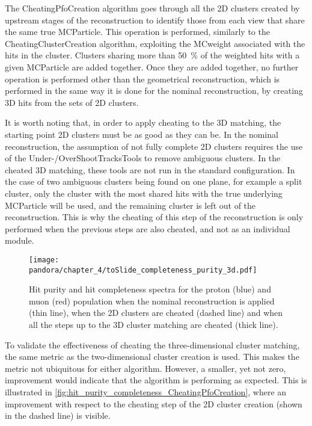 The CheatingPfoCreation algorithm goes through all the 2D clusters created by upstream stages of the reconstruction to identify those from each view that share the same true MCParticle. This operation is performed, similarly to the CheatingClusterCreation algorithm, exploiting the MCweight associated with the hits in the cluster. Clusters sharing more than \SI{50}{\percent} of the weighted hits with a given MCParticle are added together. Once they are added together, no further operation is performed other than the geometrical reconstruction, which is performed in the same way it is done for the nominal reconstruction, by creating 3D hits from the sets of 2D clusters. 

It is worth noting that, in order to apply cheating to the 3D matching, the starting point 2D clusters must be as good as they can be. In the nominal reconstruction, the assumption of not fully complete 2D clusters requires the use of the Under-/OverShootTracksTools to remove ambiguous clusters. In the cheated 3D matching, these tools are not run in the standard configuration. In the case of two ambiguous clusters being found on one plane, for example a split cluster, only the cluster with the most shared hits with the true underlying MCParticle will be used, and the remaining cluster is left out of the reconstruction. This is why the cheating of this step of the reconstruction is only performed when the previous steps are also cheated, and not as an individual module. 

\begin{figure}
    \centering
    \texttt{[image: pandora/chapter\_4/toSlide\_completeness\_purity\_3d.pdf]}
    \caption[Hit purity and completeness with CheatingPfoCreation algorithm]{Hit purity and hit completeness spectra for the proton (blue) and muon (red) population when the nominal reconstruction is applied (thin line), when the 2D clusters are cheated (dashed line) and when all the steps up to the 3D cluster matching are cheated (thick line).}
    \label{fig:hit_purity_completeness_CheatingPfoCreation}
\end{figure}

To validate the effectiveness of cheating the three-dimensional cluster matching, the same metric as the two-dimensional cluster creation is used. This makes the metric not ubiquitous for either algorithm. However, a smaller, yet not zero, improvement would indicate that the algorithm is performing as expected. This is illustrated in \autoref{fig:hit_purity_completeness_CheatingPfoCreation}, where an improvement with respect to the cheating step of the 2D cluster creation (shown in the dashed line) is visible. 

